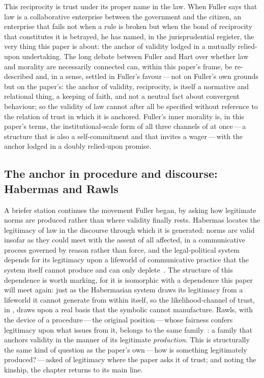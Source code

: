 This reciprocity is trust under its proper name in the law. When Fuller says that law is a collaborative enterprise between the government and the citizen, an enterprise that fails not when a rule is broken but when the bond of reciprocity that constitutes it is betrayed, he has named, in the jurisprudential register, the very thing this paper is about: the anchor of validity lodged in a mutually relied-upon undertaking. The long debate between Fuller and Hart over whether law and morality are necessarily connected can, within this paper's frame, be re-described and, in a sense, settled in Fuller's favour\,---\,not on Fuller's own grounds but on the paper's: the anchor of validity, reciprocity, is itself a normative and relational thing, a keeping of faith, and not a neutral fact about convergent behaviour; so the validity of law cannot after all be specified without reference to the relation of trust in which it is anchored. Fuller's inner morality is, in this paper's terms, the institutional-scale form of all three channels of  at once\,---\,a structure that is also a self-commitment and that invites a wager\,---\,with the anchor lodged in a doubly relied-upon promise.

\subsection{The anchor in procedure and discourse: Habermas and Rawls}
\label{p13:sub:jur-habermas}

A briefer station continues the movement Fuller began, by asking how legitimate norms are produced rather than where validity finally rests. Habermas locates the legitimacy of law in the discourse through which it is generated: norms are valid insofar as they could meet with the assent of all affected, in a communicative process governed by reason rather than force, and the legal-political system depends for its legitimacy upon a lifeworld of communicative practice that the system itself cannot produce and can only deplete~\parencite{habermas1996}. The structure of this dependence is worth marking, for it is isomorphic with a dependence this paper will meet again: just as the Habermasian system draws its legitimacy from a lifeworld it cannot generate from within itself, so the likelihood-channel of trust, in , draws upon a real basis that the symbolic cannot manufacture. Rawls, with the device of a procedure\,---\,the original position\,---\,whose fairness confers legitimacy upon what issues from it, belongs to the same family~\parencite{rawls1971}: a family that anchors validity in the manner of its legitimate \emph{production}. This is structurally the same kind of question as the paper's own\,---\,how is something legitimately produced?\,---\,asked of legitimacy where the paper asks it of trust; and noting the kinship, the chapter returns to its main line.

